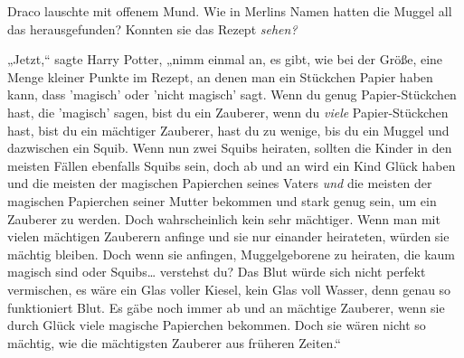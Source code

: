 Draco lauschte mit offenem Mund. Wie in Merlins Namen hatten die Muggel all das herausgefunden? Konnten sie das Rezept \emph{sehen?}

„Jetzt,“ sagte Harry Potter, „nimm einmal an, es gibt, wie bei der Größe, eine Menge kleiner Punkte im Rezept, an denen man ein Stückchen Papier haben kann, dass 'magisch' oder 'nicht magisch' sagt. Wenn du genug Papier-Stückchen hast, die 'magisch' sagen, bist du ein Zauberer, wenn du \emph{viele} Papier-Stückchen hast, bist du ein mächtiger Zauberer, hast du zu wenige, bis du ein Muggel und dazwischen ein Squib. Wenn nun zwei Squibs heiraten, sollten die Kinder in den meisten Fällen ebenfalls Squibs sein, doch ab und an wird ein Kind Glück haben und die meisten der magischen Papierchen seines Vaters \emph{und} die meisten der magischen Papierchen seiner Mutter bekommen und stark genug sein, um ein Zauberer zu werden. Doch wahrscheinlich kein sehr mächtiger. Wenn man mit vielen mächtigen Zauberern anfinge und sie nur einander heirateten, würden sie mächtig bleiben. Doch wenn sie anfingen, Muggelgeborene zu heiraten, die kaum magisch sind oder Squibs… verstehst du? Das Blut würde sich nicht perfekt vermischen, es wäre ein Glas voller Kiesel, kein Glas voll Wasser, denn genau so funktioniert Blut. Es gäbe noch immer ab und an mächtige Zauberer, wenn sie durch Glück viele magische Papierchen bekommen. Doch sie wären nicht so mächtig, wie die mächtigsten Zauberer aus früheren Zeiten.“

